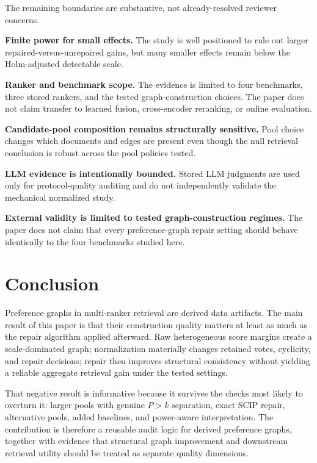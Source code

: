 \documentclass[acmsmall,anonymous,review]{acmart}
\begin{document}
The remaining boundaries are substantive, not already-resolved reviewer
concerns.

\textbf{Finite power for small effects.} The study is well positioned to
rule out larger repaired-versus-unrepaired gains, but many smaller effects
remain below the Holm-adjusted detectable scale.

\textbf{Ranker and benchmark scope.} The evidence is limited to four
benchmarks, three stored rankers, and the tested graph-construction choices.
The paper does not claim transfer to learned fusion, cross-encoder
reranking, or online evaluation.

\textbf{Candidate-pool composition remains structurally sensitive.} Pool
choice changes which documents and edges are present even though the null
retrieval conclusion is robust across the pool policies tested.

\textbf{LLM evidence is intentionally bounded.} Stored LLM judgments are used
only for protocol-quality auditing and do not independently validate the
mechanical normalized study.

\textbf{External validity is limited to tested graph-construction regimes.}
The paper does not claim that every preference-graph repair setting should
behave identically to the four benchmarks studied here.

\section{Conclusion}
\label{sec:conclusion}

Preference graphs in multi-ranker retrieval are derived data artifacts. The
main result of this paper is that their construction quality matters at
least as much as the repair algorithm applied afterward. Raw heterogeneous
score margins create a scale-dominated graph; normalization materially
changes retained votes, cyclicity, and repair decisions; repair then
improves structural consistency without yielding a reliable aggregate
retrieval gain under the tested settings.

That negative result is informative because it survives the checks most
likely to overturn it: larger pools with genuine $P>k$ separation, exact
SCIP repair, alternative pools, added baselines, and power-aware
interpretation. The contribution is therefore a reusable audit logic for
derived preference graphs, together with evidence that structural graph
improvement and downstream retrieval utility should be treated as separate
quality dimensions.
\end{document}

